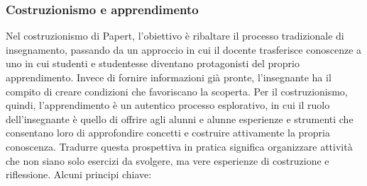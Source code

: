 \subsubsection{Costruzionismo e apprendimento}


Nel costruzionismo di Papert, l'obiettivo è ribaltare il processo tradizionale di insegnamento, passando da un approccio in cui il docente trasferisce conoscenze a uno in cui studenti e studentesse diventano protagonisti del proprio apprendimento. Invece di fornire informazioni già pronte, l'insegnante ha il compito di creare condizioni che favoriscano la scoperta. Per il costruzionismo, quindi, l'apprendimento è un autentico processo esplorativo, in cui il ruolo dell'insegnante è quello di offrire agli alunni e alunne esperienze e strumenti che consentano loro di approfondire concetti e costruire attivamente la propria conoscenza. Tradurre questa prospettiva in pratica significa organizzare attività che non siano solo esercizi da svolgere, ma vere esperienze di costruzione e riflessione. Alcuni principi chiave:

